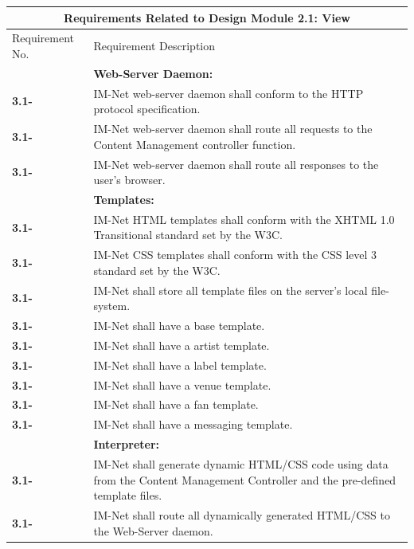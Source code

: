 \documentclass[letterpaper,12pt]{article}
\newcounter{rcounter}							%
\newcommand\rnumber{\stepcounter{rcounter}\arabic{rcounter}}
\begin{document}
{\begin{center}
\begin{tabular}{|l|p{6in}|}
\hline 
\multicolumn{2}{|c|}{\textbf{Requirements Related to Design Module 2.1: View}} \\ 
\hline 
Requirement No. & Requirement Description \\ 
\hline
& \textbf{Web-Server Daemon:} \\
\hline
\textbf{3.1-\rnumber} & IM-Net web-server daemon shall conform to the HTTP protocol specification. \\ 
\hline 
\textbf{3.1-\rnumber} & IM-Net web-server daemon shall route all requests to the Content Management controller function. \\ 
\hline 
\textbf{3.1-\rnumber} & IM-Net web-server daemon shall route all responses to the user's browser. \\ 
\hline  
& \textbf{Templates:} \\
\hline
\textbf{3.1-\rnumber} & IM-Net HTML templates shall conform with the XHTML 1.0 Transitional standard set by the W3C. \\ 
\hline 
\textbf{3.1-\rnumber} & IM-Net CSS templates shall conform with the CSS level 3 standard set by the W3C. \\ 
\hline 
\textbf{3.1-\rnumber} & IM-Net shall store all template files on the server's local file-system. \\
\hline
\textbf{3.1-\rnumber} & IM-Net shall have a base template. \\ 
\hline 
\textbf{3.1-\rnumber} & IM-Net shall have a artist template. \\ 
\hline 
\textbf{3.1-\rnumber} & IM-Net shall have a label template. \\ 
\hline 
\textbf{3.1-\rnumber} & IM-Net shall have a venue template. \\ 
\hline 
\textbf{3.1-\rnumber} & IM-Net shall have a fan template. \\ 
\hline 
\textbf{3.1-\rnumber} & IM-Net shall have a messaging template. \\ 
\hline 
& \textbf{Interpreter:} \\
\hline
\textbf{3.1-\rnumber} & IM-Net shall generate dynamic HTML/CSS code using data from the Content Management Controller and the pre-defined template files. \\ 
\hline 
\textbf{3.1-\rnumber} & IM-Net shall route all dynamically generated HTML/CSS to the Web-Server daemon. \\ 
\hline 


\end{tabular}
\end{center}}
\end{document}
